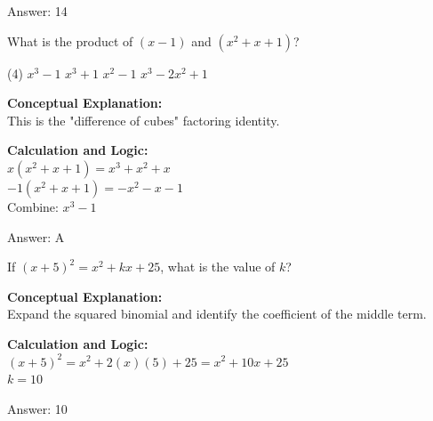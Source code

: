 \documentclass[11pt,paper=a4,answers]{exam}
\begin{document}
\begin{questions}
\begin{solution}
Answer: \colorbox{yellow!100}{14}
\end{solution}

\vspace{40pt}

\question
What is the product of $(x - 1)$ and $(x^2 + x + 1)$?
\begin{tasks}(4)
    \task $x^3 - 1$
    \task $x^3 + 1$
    \task $x^2 - 1$
    \task $x^3 - 2x^2 + 1$
\end{tasks}

\begin{solution}
\textbf{Conceptual Explanation:} \\
This is the "difference of cubes" factoring identity.

\vspace{20pt}

\textbf{Calculation and Logic:} \\
$x(x^2 + x + 1) = x^3 + x^2 + x$ \\
$-1(x^2 + x + 1) = -x^2 - x - 1$ \\
Combine: $x^3 - 1$

\vspace{25pt}

Answer: \colorbox{yellow!100}{A}
\end{solution}

\vspace{40pt}

\question
If $(x + 5)^2 = x^2 + kx + 25$, what is the value of $k$?

\begin{solution}
\textbf{Conceptual Explanation:} \\
Expand the squared binomial and identify the coefficient of the middle term.

\vspace{20pt}

\textbf{Calculation and Logic:} \\
$(x + 5)^2 = x^2 + 2(x)(5) + 25 = x^2 + 10x + 25$ \\
$k = 10$

\vspace{25pt}

Answer: \colorbox{yellow!100}{10}
\end{solution}

\vspace{40pt}


\end{questions}
\end{document}

